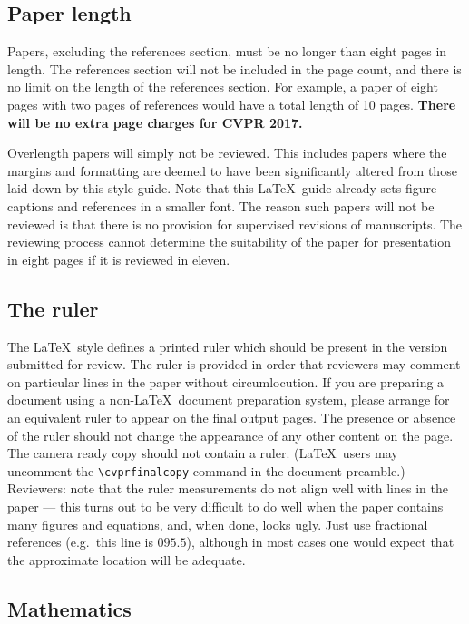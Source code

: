 \documentclass[12pt,letterpaper]{article}
\begin{document}
\subsection{Paper length}
Papers, excluding the references section,
must be no longer than eight pages in length. The references section
will not be included in the page count, and there is no limit on the
length of the references section. For example, a paper of eight pages
with two pages of references would have a total length of 10 pages.
{\bf There will be no extra page charges for
  CVPR 2017.}

Overlength papers will simply not be reviewed.  This includes papers
where the margins and formatting are deemed to have been significantly
altered from those laid down by this style guide.  Note that this
\LaTeX\ guide already sets figure captions and references in a smaller font.
The reason such papers will not be reviewed is that there is no provision for
supervised revisions of manuscripts.  The reviewing process cannot determine
the suitability of the paper for presentation in eight pages if it is
reviewed in eleven.  

\subsection{The ruler}
The \LaTeX\ style defines a printed ruler which should be present in the
version submitted for review.  The ruler is provided in order that
reviewers may comment on particular lines in the paper without
circumlocution.  If you are preparing a document using a non-\LaTeX\
document preparation system, please arrange for an equivalent ruler to
appear on the final output pages.  The presence or absence of the ruler
should not change the appearance of any other content on the page.  The
camera ready copy should not contain a ruler. (\LaTeX\ users may uncomment
the \verb'\cvprfinalcopy' command in the document preamble.)  Reviewers:
note that the ruler measurements do not align well with lines in the paper
--- this turns out to be very difficult to do well when the paper contains
many figures and equations, and, when done, looks ugly.  Just use fractional
references (e.g.\ this line is $095.5$), although in most cases one would
expect that the approximate location will be adequate.

\subsection{Mathematics}
\end{document}
